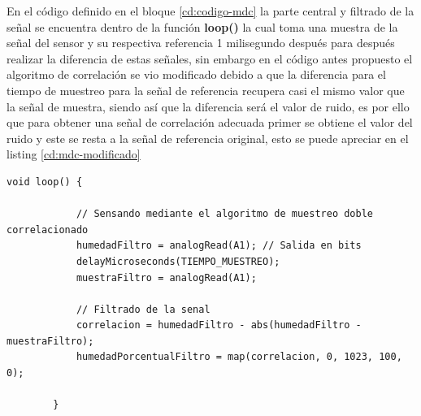 \documentclass[conference]{IEEEtran}
\begin{document}
	En el código definido en el bloque \ref{cd:codigo-mdc} la parte central y filtrado de la señal se encuentra dentro de la función \textbf{loop()} la cual toma una muestra de la señal del sensor y su respectiva referencia 1 milisegundo después para después realizar la diferencia de estas señales, sin embargo en el código antes propuesto el algoritmo de correlación  se vio modificado debido a que la diferencia para el tiempo de muestreo para la señal de referencia recupera casi el mismo valor que la señal de muestra, siendo así que la diferencia será el valor de ruido, es por ello que para obtener una señal de correlación adecuada primer se obtiene el valor del ruido y este se resta a la señal de referencia original, esto se puede apreciar en el listing \ref{cd:mdc-modificado}
	
	\begin{lstlisting}[caption=Arduino Muestreo doble Correlacionado, numbers=none, label=cd:mdc-modificado]
		void loop() {
			
			// Sensando mediante el algoritmo de muestreo doble correlacionado
			humedadFiltro = analogRead(A1); // Salida en bits
			delayMicroseconds(TIEMPO_MUESTREO);
			muestraFiltro = analogRead(A1);
			
			// Filtrado de la senal
			correlacion = humedadFiltro - abs(humedadFiltro - muestraFiltro);
			humedadPorcentualFiltro = map(correlacion, 0, 1023, 100, 0);
			
		}
	\end{lstlisting}
	
	
	
\end{document}
